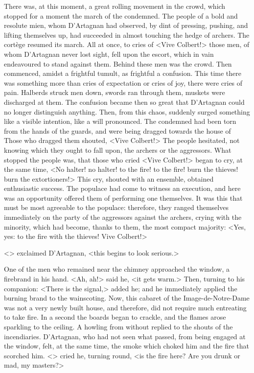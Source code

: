 There was, at this moment, a great rolling movement in the crowd, which stopped for a moment the march of the condemned. The people of a bold and resolute mien, whom D'Artagnan had observed, by dint of pressing, pushing, and lifting themselves up, had succeeded in almost touching the hedge of archers. The cortège resumed its march. All at once, to cries of <Vive Colbert!> those men, of whom D'Artagnan never lost sight, fell upon the escort, which in vain endeavoured to stand against them. Behind these men was the crowd. Then commenced, amidst a frightful tumult, as frightful a confusion. This time there was something more than cries of expectation or cries of joy, there were cries of pain. Halberds struck men down, swords ran through them, muskets were discharged at them. The confusion became then so great that D'Artagnan could no longer distinguish anything. Then, from this chaos, suddenly surged something like a visible intention, like a will pronounced. The condemned had been torn from the hands of the guards, and were being dragged towards the house of  Those who dragged them shouted, <Vive Colbert!> The people hesitated, not knowing which they ought to fall upon, the archers or the aggressors. What stopped the people was, that those who cried <Vive Colbert!> began to cry, at the same time, <No halter! no halter! to the fire! to the fire! burn the thieves! burn the extortioners!> This cry, shouted with an ensemble, obtained enthusiastic success. The populace had come to witness an execution, and here was an opportunity offered them of performing one themselves. It was this that must be most agreeable to the populace: therefore, they ranged themselves immediately on the party of the aggressors against the archers, crying with the minority, which had become, thanks to them, the most compact majority: <Yes, yes: to the fire with the thieves! Vive Colbert!>

<> exclaimed D'Artagnan, <this begins to look serious.>

One of the men who remained near the chimney approached the window, a firebrand in his hand. <Ah, ah!> said he, <it gets warm.> Then, turning to his companion: <There is the signal,> added he; and he immediately applied the burning brand to the wainscoting. Now, this cabaret of the Image-de-Notre-Dame was not a very newly built house, and therefore, did not require much entreating to take fire. In a second the boards began to crackle, and the flames arose sparkling to the ceiling. A howling from without replied to the shouts of the incendiaries. D'Artagnan, who had not seen what passed, from being engaged at the window, felt, at the same time, the smoke which choked him and the fire that scorched him. <> cried he, turning round, <is the fire here? Are you drunk or mad, my masters?>

